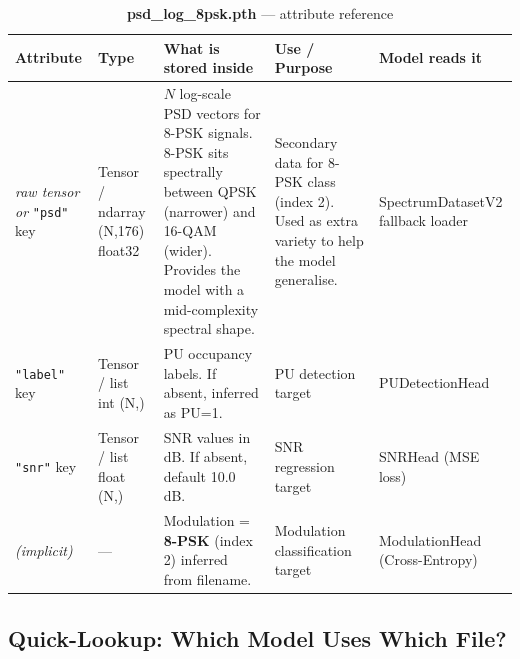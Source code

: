 \documentclass[11pt,a4paper]{article}
\begin{document}
\begin{table}[h!]
\centering
\caption{\textbf{psd\_log\_8psk.pth} — attribute reference}
\renewcommand{\arraystretch}{1.55}
\begin{tabularx}{\textwidth}{>{\ttfamily\small}l l X l l}
\toprule
\textbf{Attribute} & \textbf{Type} & \textbf{What is stored inside} & \textbf{Use / Purpose} & \textbf{Model reads it} \\
\midrule

\textit{raw tensor or}
\texttt{"psd"} key
  & Tensor / ndarray (N,176) float32
  & $N$ log-scale PSD vectors for 8-PSK signals.
    8-PSK sits spectrally between QPSK (narrower) and 16-QAM (wider).
    Provides the model with a mid-complexity spectral shape.
  & Secondary data for 8-PSK class (index 2).
    Used as extra variety to help the model generalise.
  & SpectrumDatasetV2 fallback loader \\[6pt]

\texttt{"label"} key
  & Tensor / list int (N,)
  & PU occupancy labels. If absent, inferred as PU=1.
  & PU detection target
  & PUDetectionHead \\[6pt]

\texttt{"snr"} key
  & Tensor / list float (N,)
  & SNR values in dB. If absent, default 10.0 dB.
  & SNR regression target
  & SNRHead (MSE loss) \\[6pt]

\textit{(implicit)}
  & —
  & Modulation = \textbf{8-PSK} (index 2) inferred from filename.
  & Modulation classification target
  & ModulationHead (Cross-Entropy) \\

\bottomrule
\end{tabularx}
\end{table}

\subsection{Quick-Lookup: Which Model Uses Which File?}
\end{document}
